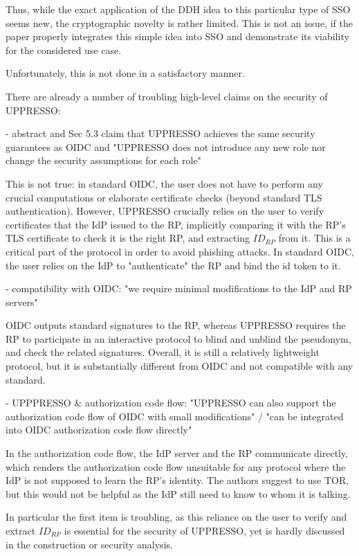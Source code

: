 \documentclass[letterpaper,onecolumn,10pt]{article}
\begin{document}
Thus, while the exact application of the DDH idea to this particular type of SSO seems new, the cryptographic novelty is rather limited. This is not an issue, if the paper properly integrates this simple idea into SSO and demonstrate its viability for the considered use case. 

Unfortunately, this is not done in a satisfactory manner.

There are already a number of troubling high-level claims on the security of UPPRESSO:

- abstract and Sec 5.3 claim that UPPRESSO achieves the same security guarantees as OIDC and "UPPRESSO does not introduce any new role nor change the security assumptions for each role"

This is not true: in standard OIDC, the user does not have to perform any crucial computations or elaborate certificate checks (beyond standard TLS authentication). However, UPPRESSO crucially relies on the user to verify certificates that the IdP issued to the RP, implicitly comparing it with the RP's TLS certificate to check it is the right RP, and extracting $ID_{RP}$ from it. This is a critical part of the protocol in order to avoid phishing attacks. In standard OIDC, the user relies on the IdP to "authenticate" the RP and bind the id token to it. 

- compatibility with OIDC: "we require minimal modifications to the IdP and RP servers"

OIDC outputs standard signatures to the RP, whereas UPPRESSO requires the RP to participate in an interactive protocol to blind and unblind the pseudonym, and check the related signatures. Overall, it is still a relatively lightweight protocol, but it is substantially different from OIDC and not compatible with any standard.  

- UPPPRESSO \& authorization code flow: "UPPRESSO can also support the authorization code flow of
OIDC with small modifications" / "can be integrated into OIDC authorization code flow directly"

In the authorization code flow, the IdP server and the RP communicate directly, which renders the authorization code flow unsuitable for any protocol where the IdP is not supposed to learn the RP's identity. The authors suggest to use TOR, but this would not be helpful as the IdP still need to know to whom it is talking.


In particular the first item is troubling, as this reliance on the user to verify and extract $ID_{RP}$ is essential for the security of UPPRESSO, yet is hardly discussed in the construction or security analysis.
\end{document}
